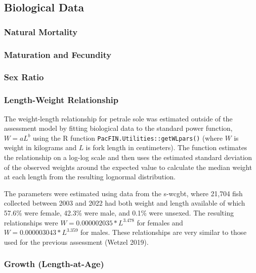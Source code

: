 \documentclass[11pt,
  english,
  letterpaper,
]{article}
\begin{document}
\hypertarget{biological-data}{%
\subsection{Biological Data}\label{biological-data}}

\hypertarget{natural-mortality}{%
\subsubsection{Natural Mortality}\label{natural-mortality}}

\hypertarget{maturation-and-fecundity}{%
\subsubsection{Maturation and Fecundity}\label{maturation-and-fecundity}}

\hypertarget{sex-ratio}{%
\subsubsection{Sex Ratio}\label{sex-ratio}}

\hypertarget{sec-biological-data-Length-Weight-relationship}{%
\subsubsection{Length-Weight Relationship}\label{sec-biological-data-Length-Weight-relationship}}

The weight-length relationship for petrale sole was estimated outside of the assessment model by fitting biological data to the standard power function, \(W = aL^b\) using the R function \texttt{PacFIN.Utilities::getWLpars()} (where \(W\) is weight in kilograms and \(L\) is fork length in centimeters). The function estimates the relationship on a log-log scale and then uses the estimated standard deviation of the observed weights around the expected value to calculate the median weight at each length from the resulting lognormal distribution.

The parameters were estimated using data from the \gls{s-wcgbt}, where 21,704 fish collected between 2003 and 2022 had both weight and length available of which 57.6\% were female, 42.3\% were male, and 0.1\% were unsexed. The resulting relationships were \(W=0.000002035 * L^{3.478}\) for females and \(W=0.000003043 * L^{3.359}\) for males. These relationships are very similar to those used for the previous assessment (Wetzel 2019).

\hypertarget{growth-length-at-age}{%
\subsubsection{Growth (Length-at-Age)}\label{growth-length-at-age}}
\end{document}
